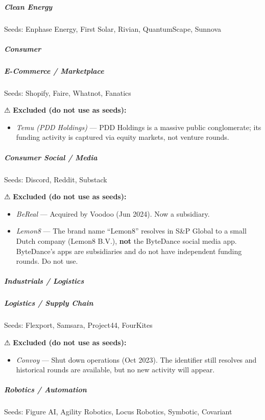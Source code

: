 \documentclass[11pt]{article}
\begin{document}
\subparagraph{Clean Energy}\mbox{}\par
Seeds: Enphase Energy, First Solar, Rivian, QuantumScape, Sunnova


\subparagraph{Consumer}\mbox{}\par

\subparagraph{E-Commerce / Marketplace}\mbox{}\par
Seeds: Shopify, Faire, Whatnot, Fanatics


⚠ \textbf{Excluded (do not use as seeds):}

\begin{itemize}[leftmargin=*,itemsep=2pt,topsep=2pt]
\item {} \emph{Temu (PDD Holdings)} — PDD Holdings is a massive public conglomerate; its funding activity is captured via equity markets, not venture rounds.
\end{itemize}

\subparagraph{Consumer Social / Media}\mbox{}\par
Seeds: Discord, Reddit, Substack


⚠ \textbf{Excluded (do not use as seeds):}

\begin{itemize}[leftmargin=*,itemsep=2pt,topsep=2pt]
\item {} \emph{BeReal} — Acquired by Voodoo (Jun 2024). Now a subsidiary.
\item {} \emph{Lemon8} — The brand name ``Lemon8'' resolves in S\&P Global to a small Dutch company (Lemon8 B.V.), \textbf{not} the ByteDance social media app. ByteDance's apps are subsidiaries and do not have independent funding rounds. Do not use.
\end{itemize}

\subparagraph{Industrials / Logistics}\mbox{}\par

\subparagraph{Logistics / Supply Chain}\mbox{}\par
Seeds: Flexport, Samsara, Project44, FourKites


⚠ \textbf{Excluded (do not use as seeds):}

\begin{itemize}[leftmargin=*,itemsep=2pt,topsep=2pt]
\item {} \emph{Convoy} — Shut down operations (Oct 2023). The identifier still resolves and historical rounds are available, but no new activity will appear.
\end{itemize}

\subparagraph{Robotics / Automation}\mbox{}\par
Seeds: Figure AI, Agility Robotics, Locus Robotics, Symbotic, Covariant
\end{document}
